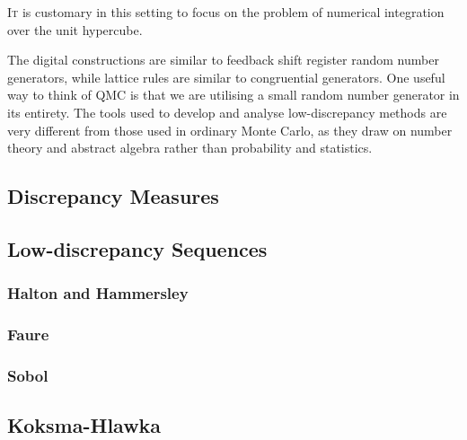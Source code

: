 \lettrine[lines=2, lhang=0.1]{I}{t} is customary in this setting to focus on the problem of numerical integration over the unit hypercube.

The digital constructions are similar to feedback shift register random number generators, while lattice rules are similar to congruential generators. One useful way to think of QMC is that we are utilising a small random number generator in its entirety. The tools used to develop and analyse low-discrepancy methods are very different from those used in ordinary Monte Carlo, as they draw on number theory and abstract algebra rather than probability and statistics.

\subsection{Discrepancy Measures}


\subsection{Low-discrepancy Sequences}

\subsubsection{Halton and Hammersley}

\subsubsection{Faure}

\subsubsection{Sobol}

\subsection{Koksma-Hlawka}